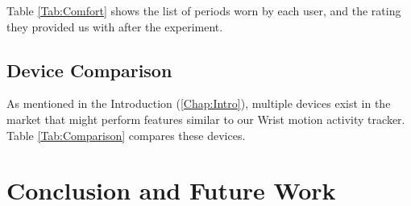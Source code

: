 Table \ref{Tab:Comfort} shows the list of periods worn by each user,
and the rating they provided us with after the experiment.

\section{Device Comparison}
\label{Sec:Comparison}
As mentioned in the Introduction (\ref{Chap:Intro}),
multiple devices exist in the market that might perform features similar to our Wrist motion activity tracker.
Table \ref{Tab:Comparison} compares these devices.

\chapter{Conclusion and Future Work}

